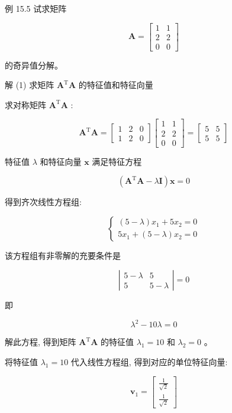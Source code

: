 \documentclass[10pt]{article}
\begin{document}
例 15.5 试求矩阵

$$
\boldsymbol{A}=\left[\begin{array}{ll}
1 & 1 \\
2 & 2 \\
0 & 0
\end{array}\right]
$$

的奇异值分解。

解 (1) 求矩阵 $\boldsymbol{A}^{\mathrm{T}} \boldsymbol{A}$ 的特征值和特征向量

求对称矩阵 $\boldsymbol{A}^{\mathrm{T}} \boldsymbol{A}$ :

$$
\boldsymbol{A}^{\mathrm{T}} \boldsymbol{A}=\left[\begin{array}{lll}
1 & 2 & 0 \\
1 & 2 & 0
\end{array}\right]\left[\begin{array}{ll}
1 & 1 \\
2 & 2 \\
0 & 0
\end{array}\right]=\left[\begin{array}{ll}
5 & 5 \\
5 & 5
\end{array}\right]
$$

特征值 $\lambda$ 和特征向量 $\boldsymbol{x}$ 满足特征方程

$$
\left(\boldsymbol{A}^{\mathrm{T}} \boldsymbol{A}-\lambda \boldsymbol{I}\right) \boldsymbol{x}=0
$$

得到齐次线性方程组:

$$
\left\{\begin{array}{l}
(5-\lambda) x_{1}+5 x_{2}=0 \\
5 x_{1}+(5-\lambda) x_{2}=0
\end{array}\right.
$$

该方程组有非零解的充要条件是

$$
\left|\begin{array}{ll}
5-\lambda & 5 \\
5 & 5-\lambda
\end{array}\right|=0
$$

即

$$
\lambda^{2}-10 \lambda=0
$$

解此方程, 得到矩阵 $\boldsymbol{A}^{\mathrm{T}} \boldsymbol{A}$ 的特征值 $\lambda_{1}=10$ 和 $\lambda_{2}=0$ 。

将特征值 $\lambda_{1}=10$ 代入线性方程组, 得到对应的单位特征向量:

$$
\boldsymbol{v}_{1}=\left[\begin{array}{c}
\frac{1}{\sqrt{2}} \\
\frac{1}{\sqrt{2}}
\end{array}\right]
$$
\end{document}
